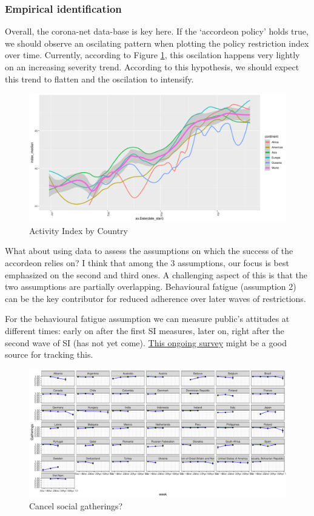 \documentclass[
  english,
  ,doc,floatsintext]{apa6}
\begin{document}
\hypertarget{empirical-identification}{%
\subsubsection{Empirical identification}\label{empirical-identification}}

Overall, the corona-net data-base is key here.
If the `accordeon policy' holds true, we should observe an oscilating pattern when plotting the policy restriction index over time.
Currently, according to Figure \ref{fig:ActIndex}, this oscilation happens very lightly on an increasing severity trend.
According to this hypothesis, we should expect this trend to flatten and the oscilation to intensify.

\begin{figure}
\centering
\includegraphics{covid-19_2_files/figure-latex/ActIndex-1.pdf}
\caption{\label{fig:ActIndex}Activity Index by Country}
\end{figure}

What about using data to assess the assumptions on which the success of the accordeon relies on?
I think that among the 3 assumptions, our focus is best emphasized on the second and third ones.
A challenging aspect of this is that the two assumptions are partially overlapping.
Behavioural fatigue (assumption 2) can be the key contributor for reduced adherence over later waves of restrictions.

For the behavioural fatigue assumption we can measure public's attitudes at different times: early on after the first SI measures, later on, right after the second wave of SI (has not yet come). \href{https://www.nber.org/papers/w27082}{This ongoing survey} might be a good source for tracking this.

\begin{figure}
\centering
\includegraphics{covid-19_2_files/figure-latex/fobG-1.pdf}
\caption{\label{fig:fobG}Cancel social gatherings?}
\end{figure}
\end{document}
